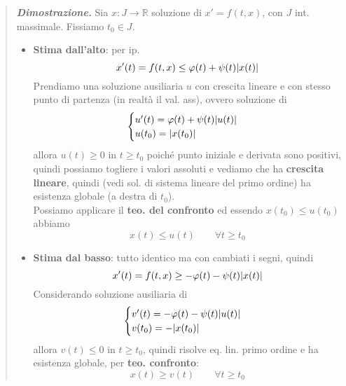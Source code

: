 \documentclass[a4paper,10pt]{article}
\newcommand{\re}{\mathbb{R}} %
\theoremstyle{indentdefinition}
\theoremstyle{indenttheorem}
\theoremstyle{myremark}
\theoremstyle{indentgeneral}
\newenvironment{dimo}{\begin{quote}\textit{\textbf{Dimostrazione.}}}{\end{quote}} %
\begin{document}
\begin{dimo}
    Sia $x:J\to\re$ soluzione di $x'=f(t,x)$, con $J$ int. massimale. Fissiamo $t_0\in J$. 
    \begin{itemize}
        \item \textbf{Stima dall'alto}: per ip. 
        $$x'(t)=f(t,x)\le\varphi(t)+\psi(t)\abs{x(t)}$$
        Prendiamo una soluzione ausiliaria $u$ con crescita lineare e con stesso punto di partenza (in realtà il val. ass), ovvero soluzione di
        $$\begin{cases}
            u'(t)=\varphi(t)+\psi(t)\abs{u(t)} \\
            u(t_0)=\abs{x(t_0)}
        \end{cases}$$
        allora $u(t)\ge 0$ in $t\ge t_0$ poiché punto iniziale e derivata sono positivi, quindi possiamo togliere i valori assoluti e vediamo che ha \textbf{crescita lineare}, quindi (vedi sol. di sistema lineare del primo ordine) ha esistenza globale (a destra di $t_0$). \\
        Possiamo applicare il \textbf{teo. del confronto} ed essendo $x(t_0)\le u(t_0)$ abbiamo 
        $$x(t)\le u(t) \quad \quad \forall t\ge t_0$$
        \item \textbf{Stima dal basso}: tutto identico ma con cambiati i segni, quindi
         $$x'(t)=f(t,x)\ge-\varphi(t)-\psi(t)\abs{x(t)}$$
         Considerando soluzione ausiliaria di 
          $$\begin{cases}
            v'(t)=-\varphi(t)-\psi(t)\abs{u(t)} \\
            v(t_0)=-\abs{x(t_0)}
        \end{cases}$$
        allora $v(t)\le 0$ in $t\ge t_0$, quindi risolve eq. lin. primo ordine e ha  esistenza globale, per \textbf{teo. confronto}:
           $$x(t)\ge v(t) \quad \quad \forall t\ge t_0$$
    \end{itemize}
\end{dimo}
\end{document}
